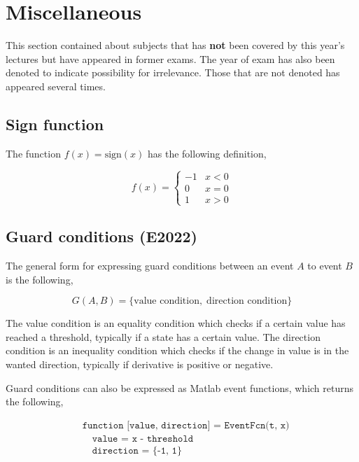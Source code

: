 \section{Miscellaneous}

This section contained about subjects that has \textbf{not} been covered by this year's lectures but have appeared in former exams. The year of exam has also been denoted to indicate possibility for irrelevance. Those that are not denoted has appeared several times.

\subsection{Sign function}

The function $f(x) = \text{sign}(x)$ has the following definition,

\begin{equation}
    f(x) = \begin{cases} -1 & x < 0 \\
0 & x = 0 \\
1 & x > 0 
\end{cases}
\end{equation}

\subsection{Guard conditions (E2022)}

The general form for expressing guard conditions between an event $A$ to event $B$ is the following,

\begin{equation*}
    G(A,B) = \{\text{value condition}, \; \text{direction condition}\}
\end{equation*}

The value condition is an equality condition which checks if a certain value has reached a threshold, typically if a state has a certain value. 
The direction condition is an inequality condition which checks if the change in value is in the wanted direction, typically if derivative is positive or negative.

Guard conditions can also be expressed as Matlab event functions, which returns the following,

\begin{align*}
    &\texttt{function [value, direction] = EventFcn(t, x)}
    \\
    &\quad \texttt{value = x - threshold}
    \\
    &\quad \texttt{direction = \{-1, 1\}}
\end{align*}

